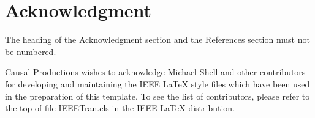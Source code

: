 \documentclass[10pt,conference,letterpaper]{IEEEtran}
\begin{document}


\section*{Acknowledgment}

The heading of the Acknowledgment section and the References section
must not be numbered.

Causal Productions wishes to acknowledge Michael Shell and other
contributors for developing and maintaining the IEEE LaTeX style files
which have been used in the preparation of this template.  To see the
list of contributors, please refer to the top of file IEEETran.cls in
the IEEE LaTeX distribution.



\end{document}
